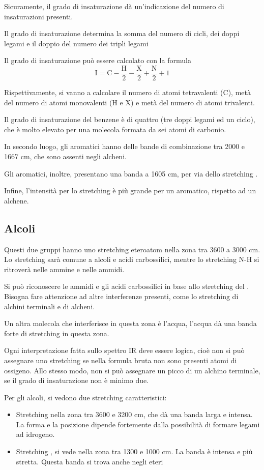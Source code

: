 Sicuramente, il grado di insaturazione dà un'indicazione del numero di
insaturazioni presenti.

Il grado di insaturazione determina la somma del numero di cicli, dei
doppi legami e il doppio del numero dei tripli legami

Il grado di insaturazione può essere calcolato con la formula
\[
\text{I} = \text{C} - \frac{\text{H}}{2} - \frac{\text{X}}{2} + \frac{\text{N}}{2} + 1
\]

Rispettivamente, si vanno a calcolare il numero di atomi tetravalenti
(C), metà del numero di atomi monovalenti (H e X) e metà del numero di
atomi trivalenti.

Il grado di insaturazione del benzene è di quattro (tre doppi legami ed
un ciclo), che è molto elevato per una molecola formata da sei atomi di
carbonio.

In secondo luogo, gli aromatici hanno delle bande di combinazione tra
2000 e 1667 cm, che sono assenti negli alcheni.

Gli aromatici, inoltre, presentano una banda a 1605 cm, per via dello
stretching .

Infine, l'intensità per lo stretching  è più grande per un aromatico,
rispetto ad un alchene.

\subsection{Alcoli}

Questi due gruppi hanno uno stretching eteroatom nella zona tra 3600
a 3000 cm. Lo stretching  sarà comune a alcoli e acidi carbossilici,
mentre lo stretching N-H si ritroverà nelle ammine e nelle ammidi.

Si può riconoscere le ammidi e gli acidi carbossilici in base allo
stretching del . Bisogna fare attenzione ad altre interferenze
presenti, come lo stretching di alchini terminali e di alcheni.

Un altra molecola che interferisce in questa zona è l'acqua, l'acqua dà
una banda forte di stretching  in questa zona.

Ogni interpretazione fatta sullo spettro IR deve essere logica, cioè non
si può assegnare uno stretching  se nella formula bruta non sono
presenti atomi di ossigeno. Allo stesso modo, non si può assegnare un
picco di un alchino terminale, se il grado di insaturazione non è minimo
due.

Per gli alcoli, si vedono due stretching caratteristici:
\begin{itemize}
\item Stretching 
nella zona tra 3600 e 3200 cm, che dà una banda larga e intensa. La
forma e la posizione dipende fortemente dalla possibilità di formare
legami ad idrogeno.
\item Stretching , si vede nella zona tra 1300 e 1000
cm. La banda è intensa e più stretta. Questa banda si trova anche
negli eteri
\end{itemize}

